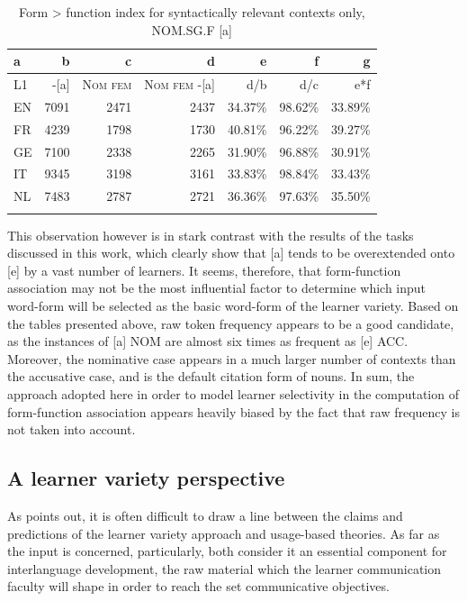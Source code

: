 \begin{table}
    \begin{tabularx}{\textwidth}{Xrrr rrr}
        \lsptoprule
        a & b & c & d & e & f & g\\
        \midrule
        L1 & {}-[a] & \textsc{Nom} \textsc{fem} & \textsc{Nom} \textsc{fem} -[a] & d/b & d/c & e*f\\
        EN & 7091 & 2471 & 2437 & 34.37\% & 98.62\% & 33.89\%\\
        FR & 4239 & 1798 & 1730 & 40.81\% & 96.22\% & 39.27\%\\
        GE & 7100 & 2338 & 2265 & 31.90\% & 96.88\% & 30.91\%\\
        IT & 9345 & 3198 & 3161 & 33.83\% & 98.84\% & 33.43\%\\
        NL & 7483 & 2787 & 2721 & 36.36\% & 97.63\% & 35.50\%\\
        \lspbottomrule
    \end{tabularx}
    \caption{Form > function index for syntactically relevant contexts only, NOM.SG.F [a]}
    \label{tab:08:2}
\end{table}

This observation however is in stark contrast with the results of the tasks discussed in this work, which clearly show that [a] tends to be overextended onto [e] by a vast number of learners. It seems, therefore, that form-function association may not be the most influential factor to determine which input word-form will be selected as the basic word-form of the learner variety. Based on the tables presented above, raw token frequency appears to be a good candidate, as the instances of [a] NOM are almost six times as frequent as [e] ACC. Moreover, the nominative case appears in a much larger number of contexts than the accusative case, and is the default citation form of nouns. In sum, the approach adopted here in order to model learner selectivity in the computation of form-function association appears heavily biased by the fact that raw frequency is not taken into account. 

\subsection{A learner variety perspective}\label{sec:08:1.3}

As \citet{Dimroth2018} points out, it is often difficult to draw a line between the claims and predictions of the learner variety approach and usage-based theories. As far as the input is concerned, particularly, both consider it an essential component for interlanguage development, the raw material which the learner communication faculty will shape in order to reach the set communicative objectives.

